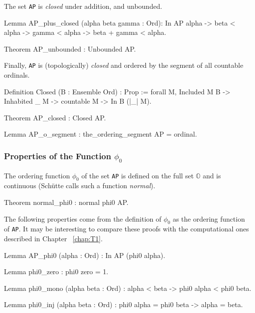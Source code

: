 {The set  \texttt{AP} is  \emph{closed} under addition, and unbounded.

\begin{Coqsrc}
Lemma AP_plus_closed (alpha beta gamma : Ord): 
     In AP alpha -> beta < alpha -> gamma < alpha ->
     beta + gamma < alpha.

Theorem AP_unbounded : Unbounded AP.
\end{Coqsrc}

Finally, \texttt{AP} is (topologically) \emph{closed} and ordered by the segment of all countable ordinals.


\begin{Coqsrc} 
Definition Closed (B : Ensemble Ord) : Prop := 
  forall M, Included M B -> Inhabited _ M -> 
                 countable M -> In B (|_| M).
\end{Coqsrc}

\begin{Coqsrc}
Theorem AP_closed : Closed AP.

Lemma AP_o_segment :  the_ordering_segment AP = ordinal.
\end{Coqsrc}

\subsubsection{Properties of the Function \texorpdfstring{$\phi_0$}{phi0}}
 
The ordering function $\phi_0$ of the set \texttt{AP} is defined on the full set $\mathbb{O}$ and is continuous (Schütte calls such a  function  \emph{normal}).

\begin{Coqsrc}
Theorem normal_phi0 : normal phi0 AP.
\end{Coqsrc}

The following properties come from  the definition of $\phi_0$ as the ordering function of \texttt{AP}. It may be interesting to compare these proofs with the computational ones described in Chapter ~\ref{chap:T1}.

\begin{Coqsrc}
Lemma AP_phi0 (alpha : Ord) : In AP (phi0 alpha).

Lemma phi0_zero : phi0 zero =  1.

Lemma phi0_mono (alpha beta : Ord) :
  alpha < beta ->  phi0 alpha < phi0 beta.

Lemma phi0_inj (alpha beta : Ord) :
    phi0 alpha = phi0 beta -> alpha = beta.


\end{Coqsrc}}
